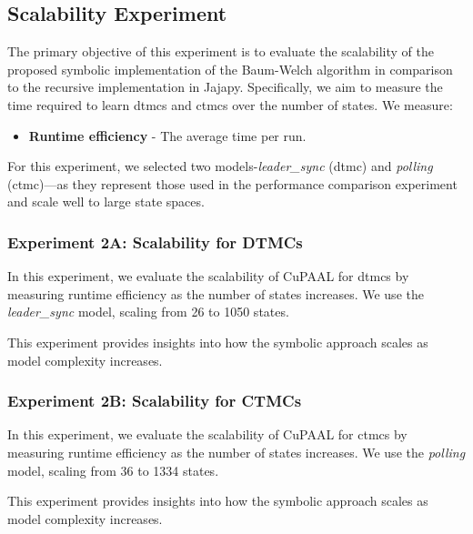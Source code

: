 \subsection{Scalability Experiment}
The primary objective of this experiment is to evaluate the scalability of the proposed symbolic implementation of the Baum-Welch algorithm in comparison to the recursive implementation in Jajapy.
Specifically, we aim to measure the time required to learn \glspl{dtmc} and \glspl{ctmc} over the number of states.
We measure:
\begin{itemize}
    \item \textbf{Runtime efficiency} - The average time per run.
\end{itemize}

For this experiment, we selected two models-\textit{leader\_sync} (\gls{dtmc}) and \textit{polling} (\gls{ctmc})—as they represent those used in the performance comparison experiment and scale well to large state spaces.

\subsubsection{Experiment 2A: Scalability for DTMCs}
In this experiment, we evaluate the scalability of CuPAAL for \glspl{dtmc} by measuring runtime efficiency as the number of states increases.
We use the \textit{leader\_sync} model, scaling from 26 to 1050 states.

This experiment provides insights into how the symbolic approach scales as model complexity increases.

\subsubsection{Experiment 2B: Scalability for CTMCs}
In this experiment, we evaluate the scalability of CuPAAL for \glspl{ctmc} by measuring runtime efficiency as the number of states increases.
We use the \textit{polling} model, scaling from 36 to 1334 states.

This experiment provides insights into how the symbolic approach scales as model complexity increases.
